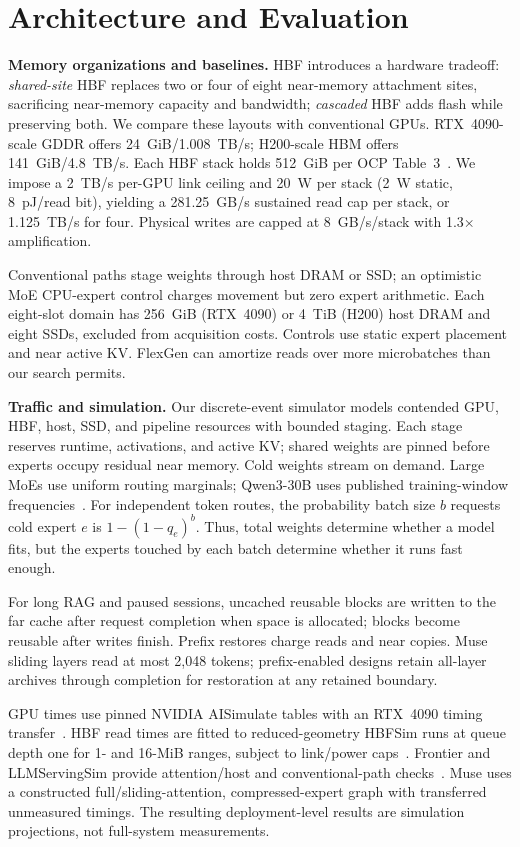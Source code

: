 \documentclass[lettersize,journal]{IEEEtran}
\begin{document}
\section{Architecture and Evaluation}
\textbf{Memory organizations and baselines.}
HBF introduces a hardware tradeoff: \emph{shared-site} HBF replaces two or four of eight near-memory attachment sites, sacrificing near-memory capacity and bandwidth; \emph{cascaded} HBF adds flash while preserving both. We compare these layouts with conventional GPUs. RTX~4090-scale GDDR offers 24~GiB/1.008~TB/s; H200-scale HBM offers 141~GiB/4.8~TB/s. Each HBF stack holds 512~GiB per OCP Table~3~\cite{ocp}. We impose a 2~TB/s per-GPU link ceiling and 20~W per stack (2~W static, 8~pJ/read bit), yielding a 281.25~GB/s sustained read cap per stack, or 1.125~TB/s for four. Physical writes are capped at 8~GB/s/stack with 1.3$\times$ amplification.

Conventional paths stage weights through host DRAM or SSD; an optimistic MoE CPU-expert control charges movement but zero expert arithmetic. Each eight-slot domain has 256~GiB (RTX~4090) or 4~TiB (H200) host DRAM and eight SSDs, excluded from acquisition costs. Controls use static expert placement and near active KV. FlexGen can amortize reads over more microbatches than our search permits.

\textbf{Traffic and simulation.}
Our discrete-event simulator models contended GPU, HBF, host, SSD, and pipeline resources with bounded staging. Each stage reserves runtime, activations, and active KV; shared weights are pinned before experts occupy residual near memory. Cold weights stream on demand. Large MoEs use uniform routing marginals; Qwen3-30B uses published training-window frequencies~\cite{suram}. For independent token routes, the probability batch size $b$ requests cold expert $e$ is $1-(1-q_e)^b$. Thus, total weights determine whether a model fits, but the experts touched by each batch determine whether it runs fast enough.

For long RAG and paused sessions, uncached reusable blocks are written to the far cache after request completion when space is allocated; blocks become reusable after writes finish. Prefix restores charge reads and near copies. Muse sliding layers read at most 2,048 tokens; prefix-enabled designs retain all-layer archives through completion for restoration at any retained boundary.

GPU times use pinned NVIDIA AISimulate tables with an RTX~4090 timing transfer~\cite{aisim}. HBF read times are fitted to reduced-geometry HBFSim runs at queue depth one for 1- and 16-MiB ranges, subject to link/power caps~\cite{hbfsim}. Frontier and LLMServingSim provide attention/host and conventional-path checks~\cite{frontier,servingsim}. Muse uses a constructed full/sliding-attention, compressed-expert graph with transferred unmeasured timings. The resulting deployment-level results are simulation projections, not full-system measurements.
\end{document}
